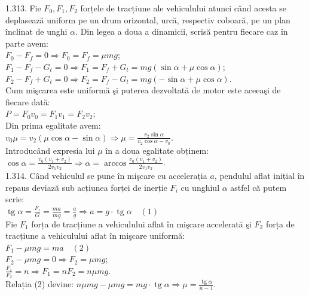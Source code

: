 1.313. Fie $F_{0}, F_{1}, F_{2}$ forțele de tracțiune ale vehiculului atunci când acesta se deplasează uniform pe un drum orizontal, urcă, respectiv coboară, pe un plan înclinat de unghi $\alpha$. Din legea a doua a dinamicii, scrisă pentru fiecare caz în parte avem:\\ $F_{0}-F_{f}=0 \Rightarrow F_{0}=F_{f}=\mu m g$;\\ $F_{1}-F_{f}-G_{t}=0 \Rightarrow F_{1}=F_{f}+G_{t}=m g(\sin \alpha+\mu \cos \alpha)$;\\ $F_{2}-F_{f}+G_{t}=0 \Rightarrow F_{2}=F_{f}-G_{t}=m g(-\sin \alpha+\mu \cos \alpha)$.\\ Cum mişcarea este uniformă şi puterea dezvoltată de motor este aceeaşi de fiecare dată:\\ $P=F_{0} v_{0}=F_{1} v_{1}=F_{2} v_{2}$;\\ Din prima egalitate avem:\\ $v_{0} \mu=v_{2}(\mu \cos \alpha-\sin \alpha) \Rightarrow \mu=\frac{v_{2} \sin \alpha}{v_{2} \cos \alpha-v_{0}}$.\\ Introducând expresia lui $\mu$ în a doua egalitate obținem:\\ $\cos \alpha=\frac{v_{0}\left(v_{1}+v_{2}\right)}{2 v_{1} v_{2}} \Rightarrow \alpha=\arccos \frac{v_{0}\left(v_{1}+v_{2}\right)}{2 v_{1} v_{2}}$.\\

1.314. Când vehiculul se pune în mişcare cu accelerația $a$, pendulul aflat inițial în repaus deviază sub acțiunea forței de inerție $F_{i}$ cu unghiul $\alpha$ astfel că putem scrie:\\ $\operatorname{tg} \alpha=\frac{F_{i}}{G}=\frac{m a}{m g}=\frac{a}{g} \Rightarrow a=g \cdot \operatorname{tg} \alpha \quad (1)$\\ Fie $F_{1}$ forța de tracțiune a vehiculului aflat în mişcare accelerată şi $F_{2}$ forța de tracțiune a vehiculului aflat în mişcare uniformă:\\ $F_{1}-\mu m g=m a  \quad (2)$\\ $F_{2}-\mu m g=0 \Rightarrow F_{2}=\mu m g$;\\ $\frac{F_{1}}{F_{2}}=n \Rightarrow F_{1}=n F_{2}=n \mu m g$.\\ Relația (2) devine: $n \mu m g-\mu m g=m g \cdot \operatorname{tg} \alpha \Rightarrow \mu=\frac{\operatorname{tg} \alpha}{n-1}$.\\

